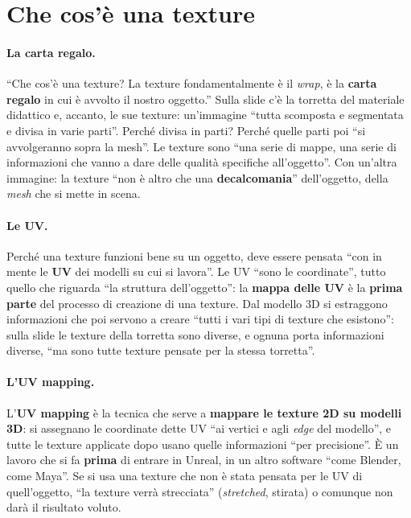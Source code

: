 \section{Che cos'è una texture}
\label{ue3:sec:texture}

\paragraph{La carta regalo.} ``Che cos'è una texture? La texture fondamentalmente è il
\emph{wrap}, è la \textbf{carta regalo} in cui è avvolto il nostro oggetto.'' Sulla
slide c'è la torretta del materiale didattico e, accanto, le sue texture: un'immagine
``tutta scomposta e segmentata e divisa in varie parti''. Perché divisa in parti?
Perché quelle parti poi ``si avvolgeranno sopra la mesh''. Le texture sono ``una serie
di mappe, una serie di informazioni che vanno a dare delle qualità specifiche
all'oggetto''. Con un'altra immagine: la texture ``non è altro che una
\textbf{decalcomania}'' dell'oggetto, della \emph{mesh} che si mette in scena.

\paragraph{Le UV.} Perché una texture funzioni bene su un oggetto, deve essere pensata
``con in mente le \textbf{UV} dei modelli su cui si lavora''. Le UV ``sono le
coordinate'', tutto quello che riguarda ``la struttura dell'oggetto'': la \textbf{mappa
delle UV} è la \textbf{prima parte} del processo di creazione di una texture. Dal
modello 3D si estraggono informazioni che poi servono a creare ``tutti i vari tipi di
texture che esistono'': sulla slide le texture della torretta sono diverse, e ognuna
porta informazioni diverse, ``ma sono tutte texture pensate per la stessa torretta''.

\paragraph{L'UV mapping.} L'\textbf{UV mapping} è la tecnica che serve a
\textbf{mappare le texture 2D su modelli 3D}: si assegnano le coordinate dette UV ``ai
vertici e agli \emph{edge} del modello'', e tutte le texture applicate dopo usano quelle
informazioni ``per precisione''. È un lavoro che si fa \textbf{prima} di entrare in
Unreal, in un altro software ``come Blender, come Maya''. Se si usa una texture che non
è stata pensata per le UV di quell'oggetto, ``la texture verrà strecciata''
(\emph{stretched}, stirata) o comunque non darà il risultato voluto.

